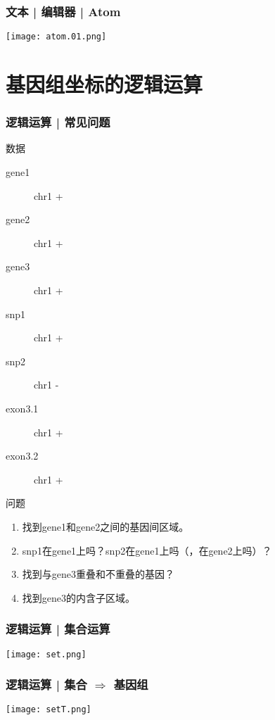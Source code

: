 \begin{frame}
  \frametitle{文本 | 编辑器 | Atom}
    \begin{center}
      \texttt{[image: atom.01.png]}
    \end{center}
\end{frame}

\section{基因组坐标的逻辑运算}
\begin{frame}
  \frametitle{逻辑运算 | 常见问题}
  \begin{block}{数据}
    \begin{description}
      \item[gene1] chr1   \quad +
      \item[gene2] chr1   \quad +
      \item[gene3] chr1   \quad +
      \item[snp1] chr1  \quad +
      \item[snp2] chr1  \quad -
      \item[exon3.1] chr1   \quad +
      \item[exon3.2] chr1   \quad +
    \end{description}
  \end{block}
  \pause
  \begin{block}{问题}
    \begin{enumerate}
      \item 找到gene1和gene2之间的基因间区域。
      \item snp1在gene1上吗？snp2在gene1上吗（，在gene2上吗）？
      \item 找到与gene3重叠和不重叠的基因？
      \item 找到gene3的内含子区域。
    \end{enumerate}
  \end{block}
\end{frame}

\begin{frame}
  \frametitle{逻辑运算 | 集合运算}
    \begin{center}
      \texttt{[image: set.png]}
    \end{center}
\end{frame}

\begin{frame}
  \frametitle{逻辑运算 | 集合 $\Rightarrow$ 基因组}
    \begin{center}
      \texttt{[image: setT.png]}
    \end{center}
\end{frame}

